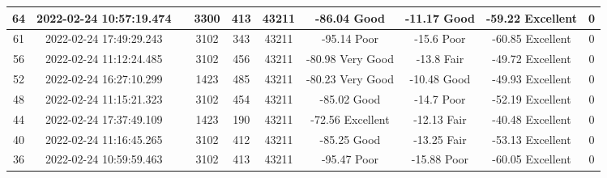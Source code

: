 \begin{longtable*}{|c|c|c|c|c|c|c|c|c|c|}
64&2022-02-24 10:57:19.474&&3300&413&43211& -86.04    Good        & -11.17    Good        & -59.22    Excellent   & 0\\\hline
{}61&2022-02-24 17:49:29.243&&3102&343&43211& -95.14    Poor        & -15.6     Poor        & -60.85    Excellent   & 0\\\hline
{}56&2022-02-24 11:12:24.485&&3102&456&43211& -80.98    Very Good   & -13.8     Fair        & -49.72    Excellent   & 0\\\hline
{}52&2022-02-24 16:27:10.299&&1423&485&43211& -80.23    Very Good   & -10.48    Good        & -49.93    Excellent   & 0\\\hline
{}48&2022-02-24 11:15:21.323&&3102&454&43211& -85.02    Good        & -14.7     Poor        & -52.19    Excellent   & 0\\\hline
{}44&2022-02-24 17:37:49.109&&1423&190&43211& -72.56    Excellent   & -12.13    Fair        & -40.48    Excellent   & 0\\\hline
{}40&2022-02-24 11:16:45.265&&3102&412&43211& -85.25    Good        & -13.25    Fair        & -53.13    Excellent   & 0\\\hline
{}36&2022-02-24 10:59:59.463&&3102&413&43211& -95.47    Poor        & -15.88    Poor        & -60.05    Excellent   & 0\\\hline

\end{longtable*}

